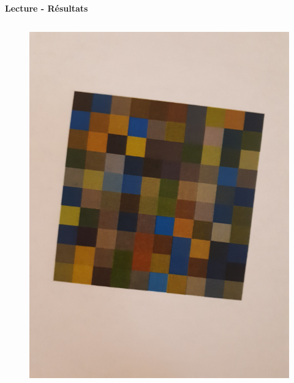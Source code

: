 \documentclass{beamer}
\begin{document}
\begin{frame}[t]
\begin{columns}[t]
\begin{column}{.49\linewidth}
                \begin{block}{\centering \textbf{Lecture - Résultats}}
                    \begin{columns}[t]
                        \begin{column}{.2\linewidth}
                            \begin{figure}[t]
                                \includegraphics[width=\linewidth]{rsc/van_gogh_picture_a_10.png}\\
                            \end{figure}
                        \end{column}


\end{columns}
\end{block}
\end{column}
\end{columns}
\end{frame}
\end{document}
